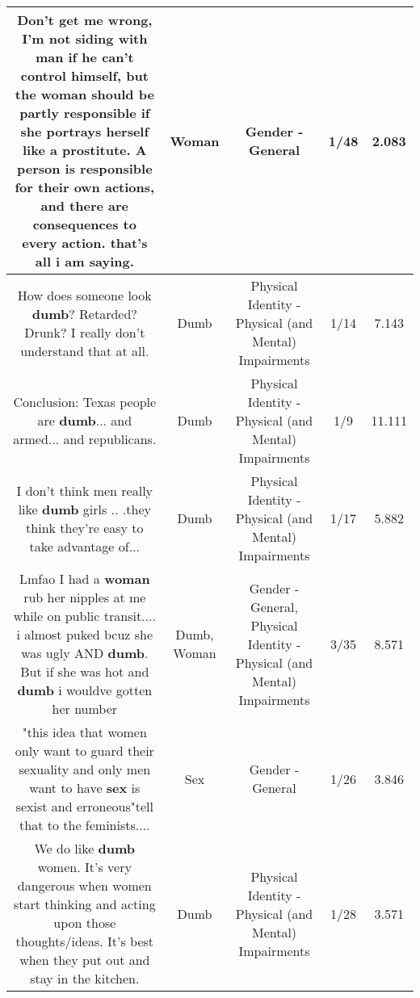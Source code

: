 \documentclass[11pt]{article}
\newlength\mylength
\begin{document}
\begin{center}
\begin{longtable}{|C{.65\mylength}|C{.30\mylength}|C{.12\mylength}|C{.12\mylength}|C{.12\mylength}|}
  \small Don't get me wrong, I'm not siding with man if he can't control himself, but the \textbf{woman} should be partly responsible if she portrays herself like a prostitute.  A person is responsible for their own actions, and there are consequences to every action.  that's all i am saying.\normalsize   & Woman & Gender - General & 1/48 & 2.083 \\  \hline
  \small How does someone look \textbf{dumb}? Retarded? Drunk? I really don't understand that at all.\normalsize   & Dumb & Physical Identity - Physical (and Mental) Impairments & 1/14 & 7.143 \\  \hline
  \small Conclusion: Texas people are \textbf{dumb}... and armed... and republicans.\normalsize   & Dumb & Physical Identity - Physical (and Mental) Impairments & 1/9 & 11.111 \\  \hline
  \small I don't think men really like \textbf{dumb} girls .. .they think they're easy to take advantage of...\normalsize   & Dumb & Physical Identity - Physical (and Mental) Impairments & 1/17 & 5.882 \\  \hline
  \small Lmfao I had a \textbf{woman} rub her nipples at me while on public transit.... i almost puked bcuz she was ugly AND \textbf{dumb}. But if she was hot and \textbf{dumb} i wouldve gotten her number\normalsize   & Dumb, Woman & Gender - General, Physical Identity - Physical (and Mental) Impairments & 3/35 & 8.571 \\  \hline
  \small "this idea that women only want to guard their sexuality and only men want to have \textbf{sex} is sexist and erroneous"tell that to the feminists....\normalsize   & Sex & Gender - General & 1/26 & 3.846 \\  \hline
  \small We do like \textbf{dumb} women. It's very dangerous when women start thinking and acting upon those thoughts/ideas. It's best when they put out and stay in the kitchen.\normalsize   & Dumb & Physical Identity - Physical (and Mental) Impairments & 1/28 & 3.571 \\  \hline

\end{longtable}
\end{center}
\end{document}
